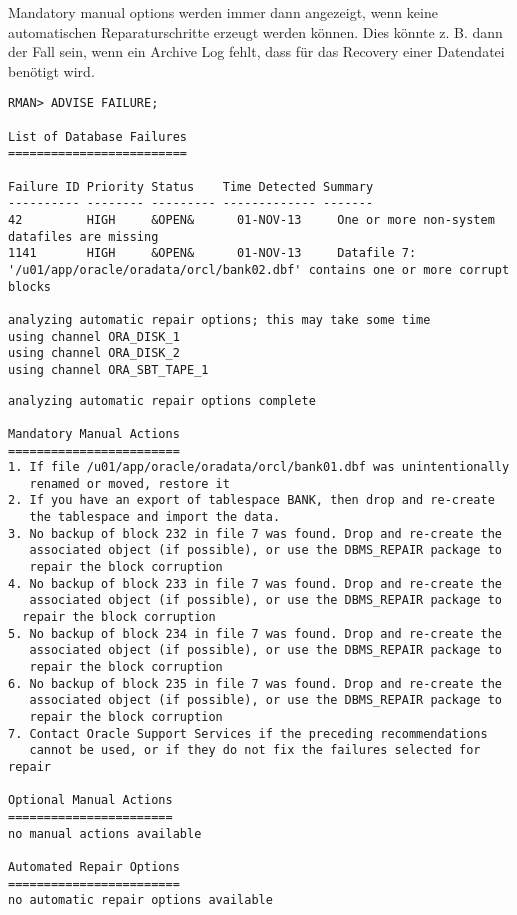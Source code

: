         Mandatory manual options werden immer dann angezeigt, wenn keine
        automatischen Reparaturschritte erzeugt werden k\"onnen. Dies k\"onnte
        z. B. dann der Fall sein, wenn ein Archive Log fehlt, dass f\"ur das
        Recovery einer Datendatei ben\"otigt wird.
        \begin{lstlisting}[caption={Mandatory manual options},label=admin1541,language=rman]
RMAN> ADVISE FAILURE;

List of Database Failures
=========================

Failure ID Priority Status    Time Detected Summary
---------- -------- --------- ------------- -------
42         HIGH     &OPEN&      01-NOV-13     One or more non-system
datafiles are missing
1141       HIGH     &OPEN&      01-NOV-13     Datafile 7:
'/u01/app/oracle/oradata/orcl/bank02.dbf' contains one or more corrupt blocks

analyzing automatic repair options; this may take some time
using channel ORA_DISK_1
using channel ORA_DISK_2
using channel ORA_SBT_TAPE_1
        \end{lstlisting}
\clearpage
        \begin{lstlisting}[language=rman]
analyzing automatic repair options complete

Mandatory Manual Actions
========================
1. If file /u01/app/oracle/oradata/orcl/bank01.dbf was unintentionally
   renamed or moved, restore it
2. If you have an export of tablespace BANK, then drop and re-create
   the tablespace and import the data.
3. No backup of block 232 in file 7 was found. Drop and re-create the
   associated object (if possible), or use the DBMS_REPAIR package to
   repair the block corruption
4. No backup of block 233 in file 7 was found. Drop and re-create the
   associated object (if possible), or use the DBMS_REPAIR package to
  repair the block corruption
5. No backup of block 234 in file 7 was found. Drop and re-create the
   associated object (if possible), or use the DBMS_REPAIR package to
   repair the block corruption
6. No backup of block 235 in file 7 was found. Drop and re-create the
   associated object (if possible), or use the DBMS_REPAIR package to
   repair the block corruption
7. Contact Oracle Support Services if the preceding recommendations
   cannot be used, or if they do not fix the failures selected for repair

Optional Manual Actions
=======================
no manual actions available

Automated Repair Options
========================
no automatic repair options available
        \end{lstlisting}
